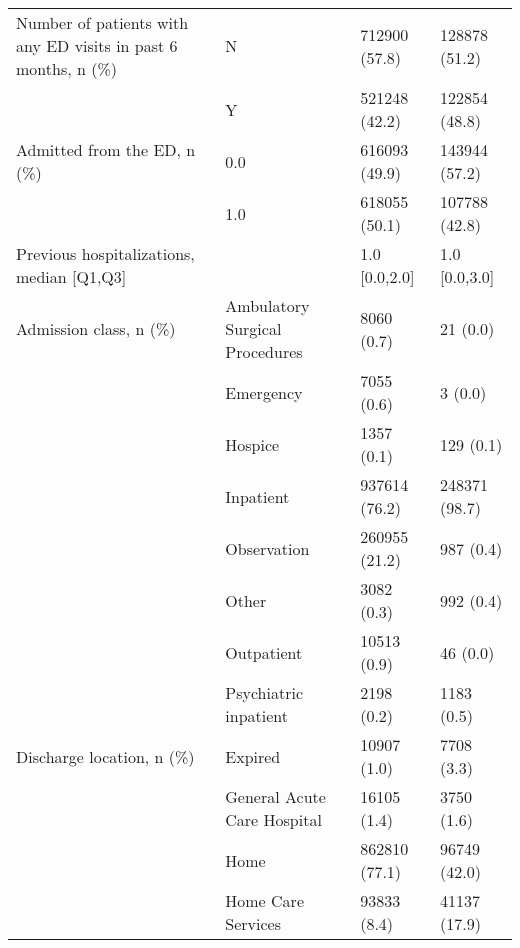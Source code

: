 \begin{tabular}{llll}
Number of patients with any ED visits in past 6 months, n (\%) & N &                         712900 (57.8) &      128878 (51.2) \\
                                       & Y &                         521248 (42.2) &      122854 (48.8) \\
Admitted from the ED, n (\%) & 0.0 &                         616093 (49.9) &      143944 (57.2) \\
                                       & 1.0 &                         618055 (50.1) &      107788 (42.8) \\
Previous hospitalizations, median [Q1,Q3] &   &                         1.0 [0.0,2.0] &      1.0 [0.0,3.0] \\
Admission class, n (\%) & Ambulatory Surgical Procedures &                            8060 (0.7) &           21 (0.0) \\
                                       & Emergency &                            7055 (0.6) &            3 (0.0) \\
                                       & Hospice &                            1357 (0.1) &          129 (0.1) \\
                                       & Inpatient &                         937614 (76.2) &      248371 (98.7) \\
                                       & Observation &                         260955 (21.2) &          987 (0.4) \\
                                       & Other &                            3082 (0.3) &          992 (0.4) \\
                                       & Outpatient &                           10513 (0.9) &           46 (0.0) \\
                                       & Psychiatric inpatient &                            2198 (0.2) &         1183 (0.5) \\
Discharge location, n (\%) & Expired &                           10907 (1.0) &         7708 (3.3) \\
                                       & General Acute Care Hospital &                           16105 (1.4) &         3750 (1.6) \\
                                       & Home &                         862810 (77.1) &       96749 (42.0) \\
                                       & Home Care Services &                           93833 (8.4) &       41137 (17.9) \\

\end{tabular}
